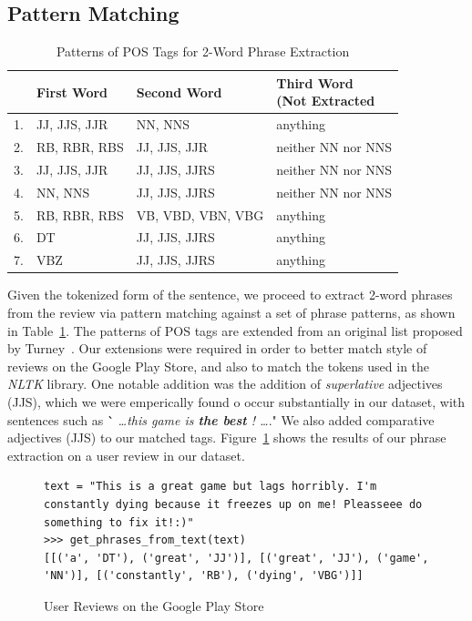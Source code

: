 \documentclass[11pt]{report} %
\begin{document}
\subsection{Pattern Matching}
\begin{table}[h]
	\centering
    \begin{tabular}{  l  l  l  l}
    \hline\hline
    	 & First Word & Second Word & \shortstack{Third Word \\ (Not Extracted} \\ \hline
	1. & JJ, JJS, JJR & NN, NNS & anything \\ \hline
	2. & RB, RBR, RBS &JJ, JJS, JJR & neither NN nor NNS \\ \hline
	3. & JJ, JJS, JJR & JJ, JJS, JJRS & neither NN nor NNS \\ \hline
	4. & NN, NNS & JJ, JJS, JJRS & neither NN nor NNS \\ \hline
	5. & RB, RBR, RBS &VB, VBD, VBN, VBG & anything \\ \hline
	6. & DT & JJ, JJS, JJRS & anything \\ \hline
	7. & VBZ & JJ, JJS, JJRS & anything \\ \hline
    \hline
    \end{tabular}
\caption{Patterns of POS Tags for 2-Word Phrase Extraction}
\label{fig:postags}
\end{table}

Given the tokenized form of the sentence, we proceed to extract 2-word phrases from the review via pattern matching against a set of phrase patterns, as shown in Table~\ref{fig:postags}. The patterns of POS tags are extended from an original list proposed by Turney~\cite{Turney2001}. Our extensions were required in order to better match style of reviews on the Google Play Store, and also to match the tokens used in the \textit{NLTK} library. One notable addition was the addition of \textit{superlative} adjectives (JJS), which we were emperically found o occur substantially in our dataset, with sentences such as \`` \textit{\dots this game is \textbf{the best} ! \dots}." We also added comparative adjectives (JJS) to our matched tags. Figure~\ref{fig:phrase_extraction} shows the results of our phrase extraction on a user review in our dataset.

\begin{figure}[h!]
  \centering
\begin{lstlisting}
text = "This is a great game but lags horribly. I'm constantly dying because it freezes up on me! Pleasseee do something to fix it!:)"
>>> get_phrases_from_text(text)
[[('a', 'DT'), ('great', 'JJ')], [('great', 'JJ'), ('game', 'NN')], [('constantly', 'RB'), ('dying', 'VBG')]]

\end{lstlisting}
 \caption{User Reviews on the Google Play Store}
\label{fig:phrase_extraction}
\end{figure}
\end{document}

